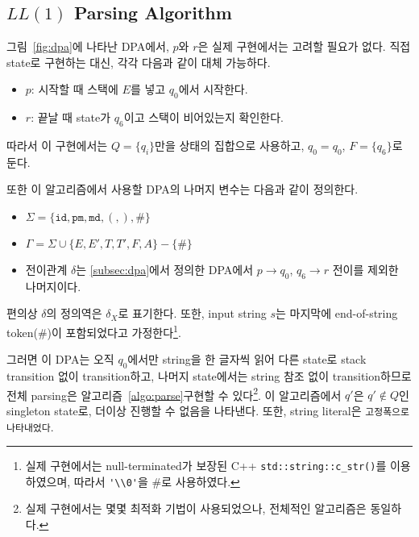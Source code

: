 \documentclass[a4paper,10pt]{scrartcl}
\numberwithin{equation}{section}
\numberwithin{figure}{section}
\numberwithin{table}{section}
\theoremstyle{definition}
\begin{document}
\subsection{$LL(1)$ Parsing Algorithm}
\label{subsec:ll1}

그림~\ref{fig:dpa}에 나타난 DPA에서, $p$와 $r$은 실제 구현에서는 고려할 필요가 없다. 직접 state로 구현하는 대신, 각각 다음과 같이 대체 가능하다.
\begin{itemize}
  \item $p$: 시작할 때 스택에 $E$를 넣고 $q_0$에서 시작한다.
  \item $r$: 끝날 때 state가 $q_6$이고 스택이 비어있는지 확인한다.
\end{itemize}
따라서 이 구현에서는 $Q = \{q_i\}$만을 상태의 집합으로 사용하고, $q_0 = q_0$, $F = \{q_6\}$로 둔다.

또한 이 알고리즘에서 사용할 DPA의 나머지 변수는 다음과 같이 정의한다.
\begin{itemize}
  \item $\Sigma = \{\texttt{id}, \texttt{pm}, \texttt{md}, (, ), \#\}$
  \item $\Gamma = \Sigma \cup \{E, E', T, T', F, A\} - \{\#\}$
  \item 전이관계 $\delta$는 \ref{subsec:dpa}에서 정의한 DPA에서 $p \to q_0$, $q_6 \to r$ 전이를 제외한 나머지이다.
\end{itemize}
편의상 $\delta$의 정의역은 $\delta_X$로 표기한다. 또한, input string $s$는 마지막에 end-of-string token($\#$)이 포함되었다고 가정한다\footnote{실제 구현에서는 null-terminated가 보장된 C++ \lstinline{std::string::c_str()}를 이용하였으며, 따라서 \lstinline{'\\0'}을 $\#$로 사용하였다.}.

그러면 이 DPA는 오직 $q_0$에서만 string을 한 글자씩 읽어 다른 state로 stack transition 없이 transition하고, 나머지 state에서는 string 참조 없이 transition하므로 전체 parsing은 알고리즘~\ref{algo:parse}\로 구현할 수 있다\footnote{실제 구현에서는 몇몇 최적화 기법이 사용되었으나, 전체적인 알고리즘은 동일하다.}. 이 알고리즘에서 $q'$은 $q' \notin Q$인 singleton state로, 더이상 진행할 수 없음을 나타낸다. 또한, string literal은 \texttt{고정폭으로 나타내었다}.
\end{document}
